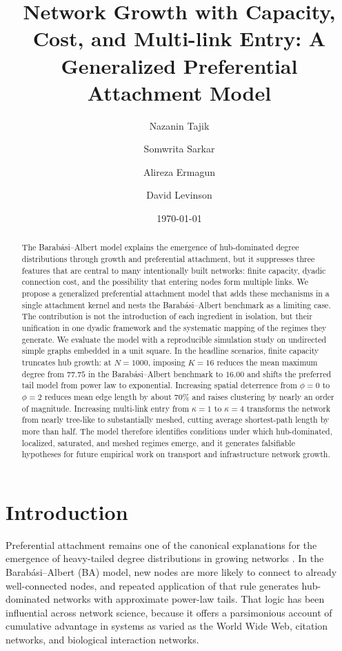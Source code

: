 \documentclass[11pt]{article}
\title{Network Growth with Capacity, Cost, and Multi-link Entry: A Generalized Preferential Attachment Model}
\author{Nazanin Tajik \and Somwrita Sarkar \and Alireza Ermagun \and David Levinson}
\date{\today}
\begin{document}
\maketitle

\begin{abstract}
The Barab\'asi--Albert model explains the emergence of hub-dominated degree distributions through growth and preferential attachment, but it suppresses three features that are central to many intentionally built networks: finite capacity, dyadic connection cost, and the possibility that entering nodes form multiple links. We propose a generalized preferential attachment model that adds these mechanisms in a single attachment kernel and nests the Barab\'asi--Albert benchmark as a limiting case. The contribution is not the introduction of each ingredient in isolation, but their unification in one dyadic framework and the systematic mapping of the regimes they generate. We evaluate the model with a reproducible simulation study on undirected simple graphs embedded in a unit square. In the headline scenarios, finite capacity truncates hub growth: at $N=1000$, imposing $K=16$ reduces the mean maximum degree from $77.75$ in the Barab\'asi--Albert benchmark to $16.00$ and shifts the preferred tail model from power law to exponential. Increasing spatial deterrence from $\phi=0$ to $\phi=2$ reduces mean edge length by about $70\%$ and raises clustering by nearly an order of magnitude. Increasing multi-link entry from $\kappa=1$ to $\kappa=4$ transforms the network from nearly tree-like to substantially meshed, cutting average shortest-path length by more than half. The model therefore identifies conditions under which hub-dominated, localized, saturated, and meshed regimes emerge, and it generates falsifiable hypotheses for future empirical work on transport and infrastructure network growth.
\end{abstract}

\section{Introduction}

Preferential attachment remains one of the canonical explanations for the emergence of heavy-tailed degree distributions in growing networks \citep{barabasi1999emergence}. In the Barab\'asi--Albert (BA) model, new nodes are more likely to connect to already well-connected nodes, and repeated application of that rule generates hub-dominated networks with approximate power-law tails. That logic has been influential across network science, because it offers a parsimonious account of cumulative advantage in systems as varied as the World Wide Web, citation networks, and biological interaction networks.
\end{document}
